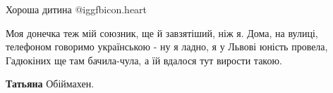\begin{itemize}
Хороша дитина @igg{fbicon.heart}

 

Моя донечка теж мій союзник, ще й завзятіший, ніж я. Дома, на вулиці, телефоном
говоримо українською - ну я ладно, я у Львові юність провела, Гадюкіних ще там
бачила-чула, а їй вдалося тут вирости такою.

\begin{itemize} %
 
\textbf{Татьяна}
Обіймахен.
\end{itemize} %

\end{itemize} %

